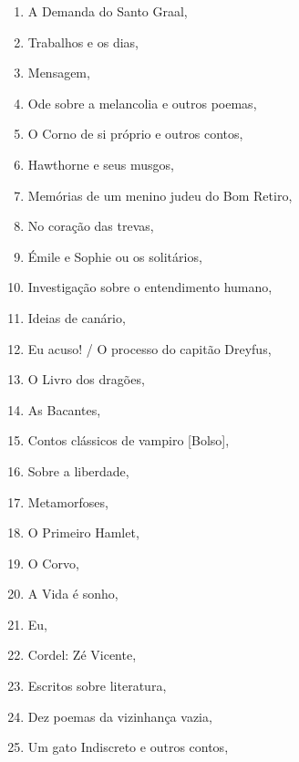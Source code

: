 \begin{multicols}{2}
\begin{enumerate}
\item A Demanda do Santo Graal, {}
\item Trabalhos e os dias, {}
\item Mensagem, {}
\item Ode sobre a melancolia e outros poemas, {}
\item O Corno de si próprio e outros contos, {}
\item Hawthorne e seus musgos, {}
\item Memórias de um menino judeu do Bom Retiro, {}
\item No coração das trevas, {}
\item Émile e Sophie ou os solitários, {}
\item Investigação sobre o entendimento humano, {}
\item Ideias de canário, {}
\item Eu acuso! / O processo do capitão Dreyfus, {}
\item O Livro dos dragões, {}
\item As Bacantes, {}
\item Contos clássicos de vampiro [Bolso], {}
\item Sobre a liberdade, {}
\item Metamorfoses, {}
\item O Primeiro Hamlet, {}
\item O Corvo, {}
\item A Vida é sonho, {}
\item Eu, {}
\item Cordel: Zé Vicente, {}
\item Escritos sobre literatura, {}
\item Dez poemas da vizinhança vazia, {}
\item Um gato Indiscreto e outros contos, {}

\end{enumerate}
\end{multicols}
